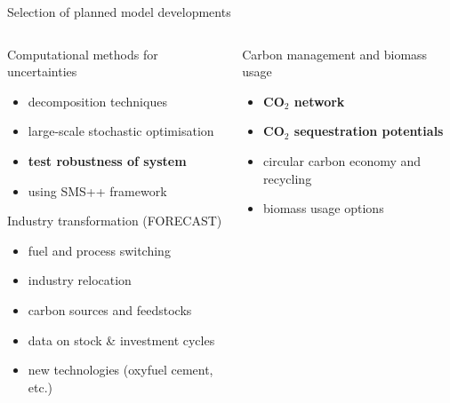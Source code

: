 \documentclass[10pt,aspectratio=169,dvipsnames]{beamer}
\begin{document}
\begin{frame}{Selection of planned model developments}
  \begin{columns}[T] %
    \begin{column}{.5\textwidth}
        \begin{minipage}[t][.45\textheight]{\linewidth}
            \begin{alertblock}{Computational methods for uncertainties}
                \begin{itemize}
                  \item decomposition techniques
                  \item large-scale stochastic optimisation
                  \item \textbf{test robustness of system}
                  \item using SMS++ framework
                \end{itemize}
            \end{alertblock}
        \end{minipage}
        
        \vspace{0.03\textheight} %
        
        \begin{minipage}[t][.45\textheight]{\linewidth}
            \begin{alertblock}{Industry transformation (FORECAST)}
              \begin{itemize}
                \item fuel and process switching
                \item industry relocation
                \item carbon sources and feedstocks
                \item data on stock \& investment cycles
                \item new technologies (oxyfuel cement, etc.)
              \end{itemize}
            \end{alertblock}
        \end{minipage}
    \end{column}
    
    \begin{column}{.5\textwidth}
        \begin{minipage}[t][.45\textheight]{\linewidth}
            \begin{alertblock}{Carbon management and biomass usage}
              \begin{itemize}
                \item \textbf{CO$_2$ network}
                \item \textbf{CO$_2$ sequestration potentials}
                \item circular carbon economy and recycling
                \item biomass usage options
              \end{itemize}
            \end{alertblock}
        \end{minipage}
        

\end{column}
\end{columns}
\end{frame}
\end{document}
